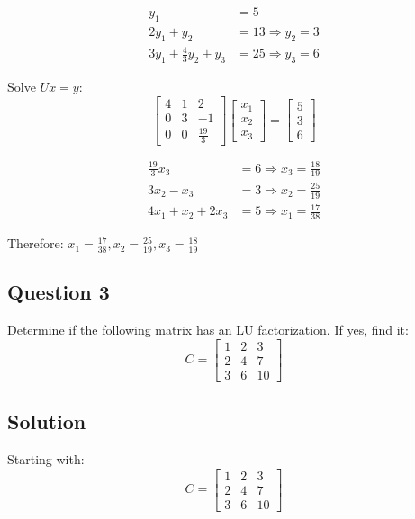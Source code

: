 \documentclass[12pt]{article}
\begin{document}
\begin{align*}
	y_1 &= 5 \\
	2y_1 + y_2 &= 13 \Rightarrow y_2 = 3 \\
	3y_1 + \frac{4}{3}y_2 + y_3 &= 25 \Rightarrow y_3 = 6
\end{align*}

Solve $Ux = y$:
\[
	\begin{bmatrix}
		4 & 1 & 2 \\
		0 & 3 & -1 \\
		0 & 0 & \frac{19}{3}
	\end{bmatrix} \begin{bmatrix}
		x_1 \\ x_2 \\ x_3
	\end{bmatrix} = \begin{bmatrix}
		5 \\ 3 \\ 6
	\end{bmatrix}
\]

\begin{align*}
	\frac{19}{3}x_3 &= 6 \Rightarrow x_3 = \frac{18}{19} \\
	3x_2 - x_3 &= 3 \Rightarrow x_2 = \frac{25}{19} \\
	4x_1 + x_2 + 2x_3 &= 5 \Rightarrow x_1 = \frac{17}{38}
\end{align*}

Therefore: $x_1 = \frac{17}{38}, x_2 = \frac{25}{19}, x_3 = \frac{18}{19}$

\subsection*{Question 3}
Determine if the following matrix has an LU factorization. If yes, find it:
$$
C = \begin{bmatrix}
1 & 2 & 3 \\
2 & 4 & 7 \\
3 & 6 & 10
\end{bmatrix}
$$

\subsection*{Solution}

Starting with:
\[
	C = \begin{bmatrix}
		1 & 2 & 3 \\
		2 & 4 & 7 \\
		3 & 6 & 10
	\end{bmatrix}
\]
\end{document}
